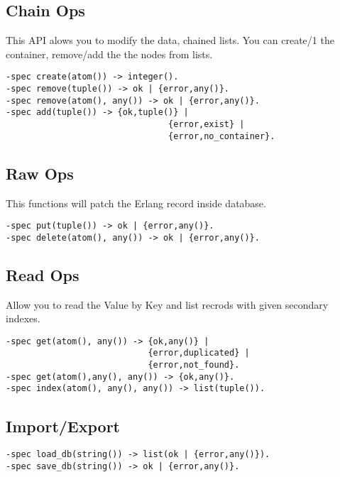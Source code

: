 \subsection{Chain Ops}
This API alows you to modify the data, chained lists.
You can create/1 the container, remove/add the the nodes from lists.

\vspace{1\baselineskip}
\begin{lstlisting}
-spec create(atom()) -> integer().
-spec remove(tuple()) -> ok | {error,any()}.
-spec remove(atom(), any()) -> ok | {error,any()}.
-spec add(tuple()) -> {ok,tuple()} | 
                                {error,exist} | 
                                {error,no_container}.
\end{lstlisting}
\vspace{1\baselineskip}


\subsection{Raw Ops}
This functions will patch the Erlang record inside database.

\vspace{1\baselineskip}
\begin{lstlisting}
-spec put(tuple()) -> ok | {error,any()}.
-spec delete(atom(), any()) -> ok | {error,any()}.
\end{lstlisting}
\vspace{1\baselineskip}

\subsection{Read Ops}
Allow you to read the Value by Key and list
recrods with given secondary indexes.

\vspace{1\baselineskip}
\begin{lstlisting}
-spec get(atom(), any()) -> {ok,any()} | 
                            {error,duplicated} |
                            {error,not_found}.
-spec get(atom(),any(), any()) -> {ok,any()}.
-spec index(atom(), any(), any()) -> list(tuple()).
\end{lstlisting}
\vspace{1\baselineskip}

\subsection{Import/Export}

\vspace{1\baselineskip}
\begin{lstlisting}
-spec load_db(string()) -> list(ok | {error,any()}).
-spec save_db(string()) -> ok | {error,any()}.
\end{lstlisting}
\vspace{1\baselineskip}
